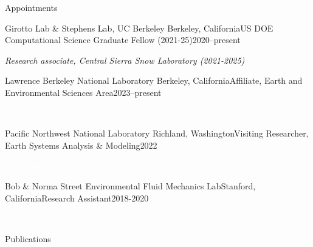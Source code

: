 \documentclass{cv}
\begin{document}
\begin{cSection}{Appointments}
\begin{cSubsection}{\vspace{1.6em}Girotto Lab \& Stephens Lab, UC Berkeley}
  {Berkeley, California}{US DOE Computational Science Graduate Fellow (2021-25)}{2020--present }
  \item \textit{Research associate, Central Sierra Snow Laboratory (2021-2025)}
\end{cSubsection}
\begin{cSubsection}{Lawrence Berkeley National Laboratory}
  {Berkeley, California}{Affiliate, Earth and Environmental Sciences Area}{2023--present }
\item  \textcolor{white}{whitespace} \vspace{-1em}
\end{cSubsection} 
\begin{cSubsection}{Pacific Northwest National Laboratory}
  {Richland, Washington}{Visiting Researcher, Earth Systems Analysis \& Modeling}{2022 }
\item  \textcolor{white}{whitespace} \vspace{-1em}
\end{cSubsection} 
\begin{cSubsection} {Bob \& Norma Street Environmental Fluid Mechanics Lab}{Stanford, California}{Research Assistant}{2018-2020 }
\item  \textcolor{white}{whitespace} \vspace{-1em}
\end{cSubsection}
\end{cSection}
\vspace{-0.2cm}
\begin{cSection}{Publications}
\end{cSection}
\end{document}
